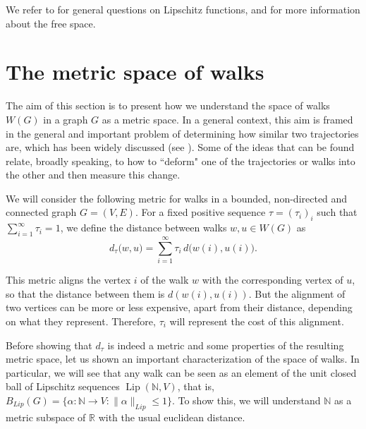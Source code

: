 \documentclass[preprint,12pt]{elsarticle}
\begin{document}
We refer to \cite{cob} for general questions on Lipschitz functions, and \cite{weaver2018lipschitz} for more information about the free space.



\section{The metric space of walks}\label{s2}

The aim of this section is to present how we understand the space of walks $W(G)$ in a graph $G$ as a metric space. In a general context, this aim is framed in the general and important problem of determining how similar two trajectories are, which has been widely discussed (see \cite{driemel2022discrete,su2020survey}). Some of the ideas that can be found relate, broadly speaking, to how to ``deform" one of the trajectories or walks into the other and then measure this change.

We will consider the following metric for walks in a bounded, non-directed and connected graph $G=(V,E)$.  For a fixed positive sequence $\tau=(\tau_i)_i$ such that $\sum_{i=1}^\infty \tau_i=1$, we define the distance between walks $w,u\in W(G)$ as
$$
d_\tau \big( w, u  \big)= \sum_{i=1}^\infty \tau_i \, d \big(w(i),u(i)\big).
$$

This metric aligns the vertex $i$ of the walk $w$ with the corresponding vertex of $u$, so that the distance between them is $d(w(i),u(i))$. But the alignment of two vertices can be more or less expensive, apart from their distance, depending on what they represent. Therefore, $\tau_i$ will represent the cost of this alignment.

Before showing that $d_\tau$ is indeed a metric and some properties of the resulting metric space, let us shown an important characterization of the space of walks. In particular, we will see that any walk can be seen as an element of the unit closed ball of Lipschitz sequences $\operatorname{Lip}(\mathbb N,V)$, that is, $B_{Lip}(G)=\{\alpha\colon\mathbb N\to V:\|\alpha\|_{Lip}\leq 1\}$. To show this, we will  understand $\mathbb N$ as a metric subspace of $\mathbb R$ with the usual euclidean distance.
\end{document}
